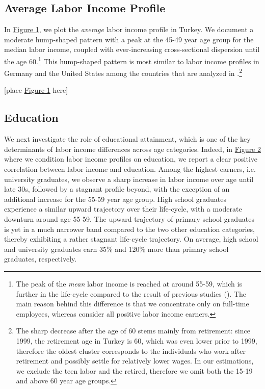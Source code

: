 \documentclass[12pt,author-year]{article}
\begin{document}
\subsection{Average Labor Income Profile}
In \hyperref[figure1]{Figure 1}, we plot the \emph{average} labor income profile in Turkey. We document a moderate hump-shaped pattern with a peak at the 45-49 year age group for the median labor income, coupled with ever-increasing cross-sectional dispersion until the age 60.\footnote{The peak of the \emph{mean} labor income is reached at around 55-59, which is further in the life-cycle compared to the result of previous studies (\citealp{Kirdar2}). The main reason behind this difference is that we concentrate only on full-time employees, whereas \citealp{Kirdar2} consider all positive labor income earners.} This hump-shaped pattern is most similar to labor income profiles in Germany and the United States among the countries that are analyzed in \cite{Lagakos}.\footnote{The sharp decrease after the age of 60 stems mainly from retirement: since 1999, the retirement age in Turkey is 60, which was even lower prior to 1999, therefore the oldest cluster corresponds to the individuals who work after retirement and possibly settle for relatively lower wages. In our estimations, we exclude the teen labor and the retired, therefore we omit both the 15-19 and above 60 year age groups.}  


\begin{center}
	[place \hyperref[figure1]{Figure 1} here]
\end{center}
\subsection{Education}
We next investigate the role of educational attainment, which is one of the key determinants of labor income differences across age categories. Indeed, in \hyperref[figure2]{Figure 2} where we condition labor income profiles on education, we report a clear positive correlation between labor income and education. Among the highest earners, i.e. university graduates, we observe a sharp increase in labor income over age until late 30s, followed by a stagnant profile beyond, with the exception of an additional increase for the 55-59 year age group. High school graduates experience a similar upward trajectory over their life-cycle, with a moderate downturn around age 55-59. The upward trajectory of primary school graduates is yet in a much narrower band compared to the two other education categories, thereby exhibiting a rather stagnant life-cycle trajectory. On average, high school and university graduates earn 35\% and 120\% more than primary school graduates, respectively.
\end{document}
